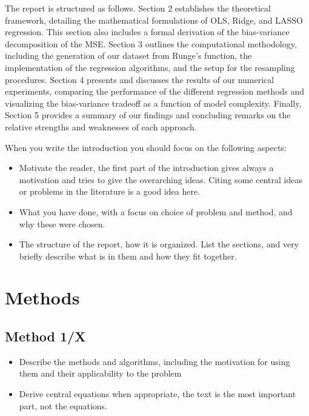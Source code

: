 \documentclass[amssymb,twocolumn,aps]{revtex4}
\begin{document}
The report is structured as follows. Section 2 establishes the theoretical framework, detailing the mathematical formulations of OLS, Ridge, and LASSO regression. This section also includes a formal derivation of the bias-variance decomposition of the MSE. Section 3 outlines the computational methodology, including the generation of our dataset from Runge's function, the implementation of the regression algorithms, and the setup for the resampling procedures. Section 4 presents and discusses the results of our numerical experiments, comparing the performance of the different regression methods and visualizing the bias-variance tradeoff as a function of model complexity. Finally, Section 5 provides a summary of our findings and concluding remarks on the relative strengths and weaknesses of each approach.


When you write the introduction you should focus on the following aspects:
\begin{itemize}
    \item Motivate the reader, the first part of the introduction gives always a motivation and tries to give the overarching ideas. Citing some central ideas or problems in the literature is a good idea here. \cite{compfys}\cite{eigenvalue}\cite{hein, hastie}
    \item What you have done, with a focus on choice of problem and method, and why these were chosen.
    \item The structure of the report, how it is organized. List the sections, and very briefly describe what is in them and how they fit together.
\end{itemize}
    
\section{Methods}\label{section:methods}

\subsection{Method 1/X}

\begin{itemize}
    \item Describe the methods and algorithms, including the motivation for using them and their applicability to the problem
    \item Derive central equations when appropriate, the text is the most important part, not the equations.
\end{itemize}
\end{document}
